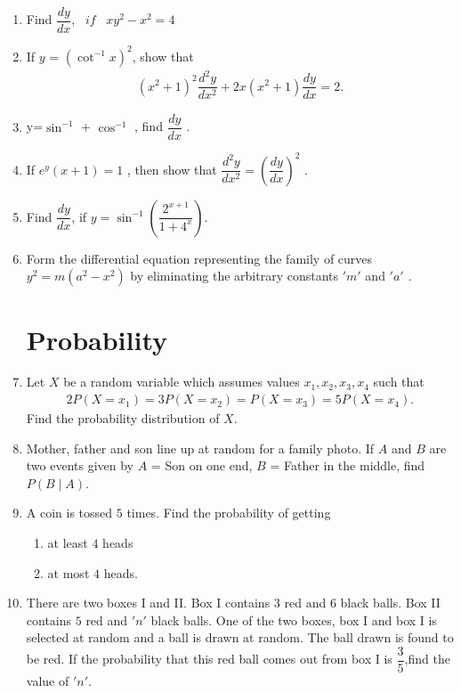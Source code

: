 \documentclass[12pt,-letter paper]{article}
\providecommand{\brak}[1]{\ensuremath{\left(#1\right)}}
\begin{document}
\begin{enumerate}
\item Find $\dfrac{dy}{dx}$,  $\hspace{6pt}  if  \hspace{6pt} $    $xy^{2}-x^{2} = 4$

\item If $y$ = $\brak{\cot^{-1} x}^{2}$, show that
\begin{align*}
\brak{x^2+1}^2 \dfrac{d^2y}{dx^2}+2x\brak{x^{2}+1}\dfrac{dy}{dx}=2.
\end{align*} 

\item y=$\sin^{-1}$ + $\cos^{-1}$ , find $\dfrac{dy}{dx}$ .

\item If $e^{y}\brak{x+1}=1$ , then show that $\dfrac{d^{2}y}{dx^{2}} =\brak{ \dfrac{dy}{dx}}^{2}$ .

\item Find $\dfrac{dy}{dx}$, if $y = \sin ^{-1}\brak{\dfrac{2^{x+1}}{1+4^{x}}}$.

\item Form the differential equation representing the family of curves $y^2=m\brak{a^2-x^2}$ by eliminating the arbitrary constants $'m'$ and $'a'$ .

\section{Probability}

\item Let $X$ be a random variable which assumes values $x_1, x_2, x_3, x_4$ such that 
\begin{align*}
2P\brak{X = x_1} = 3P\brak{X = x_2} = P\brak{X = x_3} = 5P\brak{X = x_4}.
\end{align*}
Find the probability distribution of $X$.

\item Mother, father and son line up at random for a family photo. If $A$ and $B$ are two events given by $A$ = Son on one end, $B$ = Father in the middle, find $P(B\mid A)$.

\item A coin is tossed $5$ times. Find the probability of getting \begin{enumerate}[label=\roman*.]
    \item  at least $4$ heads
    \item at most $4$ heads.
    \end{enumerate}
    
    \item There are two boxes I and II. Box I contains $3$ red and $6$ black balls. Box II contains $5$ red and $'n'$ black balls. One of the two boxes, box I and box I is selected at random and a ball is drawn at random. The ball drawn is found to be red. If the probability that this red ball comes out from box I is $\dfrac{3}{5}$,find the value of $'n'$.


\end{enumerate}
\end{document}
